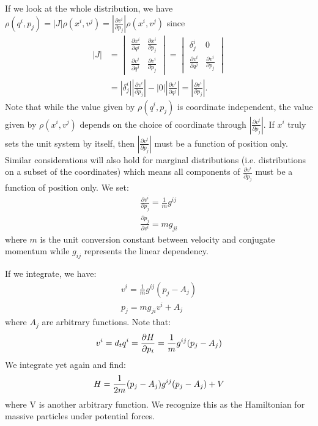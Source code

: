 \documentclass[letterpaper]{article}
\begin{document}
If we look at the whole distribution, we have $\rho(q^i, p_j) = |J| \rho(x^i, v^j) = \left|\frac{\partial v^i}{\partial p_j}\right| \rho(x^i, v^j)$ since
\begin{equation}
\begin{aligned}
|J| &= \begin{vmatrix}
\frac{\partial x^i}{\partial q^j} & \frac{\partial x^i}{\partial p_j} \\
\frac{\partial v^i}{\partial q^j} & \frac{\partial v^i}{\partial p_j}
\end{vmatrix}
= \begin{vmatrix}
\delta^i_j & 0 \\
\frac{\partial v^i}{\partial q^j} & \frac{\partial v^i}{\partial p_j}
\end{vmatrix} \\
&= \left|\delta^i_j\right| \left|\frac{\partial v^i}{\partial p_j}\right| - \left|0\right| \left|\frac{\partial v^i}{\partial q^j}\right|
= \left|\frac{\partial v^i}{\partial p_j}\right|.
\end{aligned}
\end{equation}
Note that while the value given by $\rho(q^i, p_j)$ is coordinate independent, the value given by $\rho(x^i, v^j)$ depends on the choice of coordinate through $\left|\frac{\partial v^i}{\partial p_j}\right|$. If $x^i$ truly sets the unit system by itself, then $\left|\frac{\partial v^i}{\partial p_j}\right|$ must be a function of position only. Similar considerations will also hold for marginal distributions (i.e. distributions on a subset of the coordinates) which means all components of $\frac{\partial v^i}{\partial p_j}$ must be a function of position only. We set:
\begin{equation}
\begin{aligned}
\frac{\partial v^i}{\partial p_j} = \frac{1}{m} g^{ij} \\
\frac{\partial p_j}{\partial v^i} = m g_{ji}
\end{aligned}
\end{equation}
where $m$ is the unit conversion constant between velocity and conjugate momentum while $g_{ij}$ represents the linear dependency.

If we integrate, we have:
\begin{equation}
\begin{aligned}
v^i = \frac{1}{m} g^{ij}(p_j - A_j) \\
p_j = m g_{ji} v^i + A_j
\end{aligned}
\end{equation}
where $A_j$ are arbitrary functions. Note that:
\begin{equation}
v^i = d_t q^i = \frac{\partial H }{\partial p_i} = \frac{1}{m} g^{ij}(p_j - A_j) \\
\end{equation}
We integrate yet again and find:
\begin{equation}
H = \frac{1}{2m} (p_j - A_j) g^{ij}(p_j - A_j) + V \\
\end{equation}
where V is another arbitrary function. We recognize this as the Hamiltonian for massive particles under potential forces.
\end{document}
